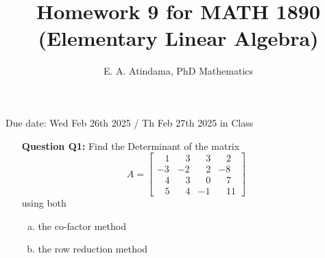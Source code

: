 \documentclass[a4paper,11pt,reqno]{amsart}
\title[MATH 1890 (Elementary Linear Algebra)]{Homework 9 for MATH 1890 (Elementary Linear Algebra)}
\author[Emmanuel Atindama]{E. A. Atindama, PhD Mathematics}
\numberwithin{equation}{section}
\begin{document}
\maketitle
Due date: Wed Feb 26th 2025 / Th Feb 27th 2025 in Class
\vspace{0.5cm}

\begin{enumerate}
    \item[\textbf{Question Q1:}]  Find the Determinant of the matrix
\[
    A = \begin{bmatrix}
        \;\;\;1 & \;\;\;3 & \;\;\;3 & \;\;\;2\\
        -3 & -2 & \;\;\;2 & -8 \\
        \;\;\;4 & \;\;\;3 & \;\;\;0 & \;\;\;7\\
         \;\;\;5 & \;\;\;4 & -1 & \;\;\;11
    \end{bmatrix}
\]
    using both 
    \begin{enumerate}[(a)]
        \item the co-factor method
        \item the row reduction method
    \end{enumerate}
\end{enumerate}
\end{document}

